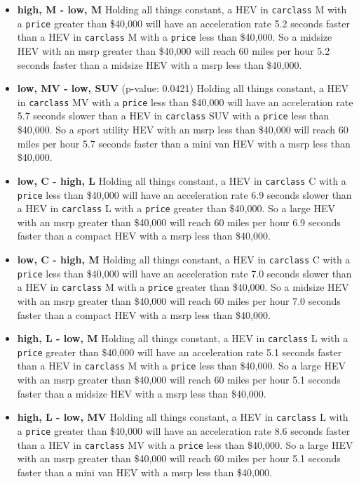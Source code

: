 \documentclass[acmsmall]{acmart}
\begin{document}
\begin{itemize}
\item[] \textbf{high, M - low, M} Holding all things constant, a HEV in \texttt{carclass} M with a \texttt{price} greater than \$40,000 will have an acceleration rate 5.2 seconds faster than a HEV in \texttt{carclass} M with a \texttt{price} less than \$40,000. So a midsize HEV with an msrp greater than \$40,000 will reach 60 miles per hour 5.2 seconds faster than a midsize HEV with a msrp less than \$40,000.
\item[] \textbf{low, MV - low, SUV} (p-value: 0.0421) Holding all things constant, a HEV in \texttt{carclass} MV with a \texttt{price} less than \$40,000 will have an acceleration rate 5.7 seconds slower than a HEV in \texttt{carclass} SUV with a \texttt{price} less than \$40,000. So a sport utility HEV with an msrp less than \$40,000 will reach 60 miles per hour 5.7 seconds faster than a mini van HEV with a msrp less than \$40,000.
\item[] \textbf{low, C - high, L} Holding all things constant, a HEV in \texttt{carclass} C with a \texttt{price} less than \$40,000 will have an acceleration rate 6.9 seconds slower than a HEV in \texttt{carclass} L with a \texttt{price} greater than \$40,000. So a large HEV with an msrp greater than \$40,000 will reach 60 miles per hour 6.9 seconds faster than a compact HEV with a msrp less than \$40,000.
\item[] \textbf{low, C - high, M} Holding all things constant, a HEV in \texttt{carclass} C with a \texttt{price} less than \$40,000 will have an acceleration rate 7.0 seconds slower than a HEV in \texttt{carclass} M with a \texttt{price} greater than \$40,000. So a midsize HEV with an msrp greater than \$40,000 will reach 60 miles per hour 7.0 seconds faster than a compact HEV with a msrp less than \$40,000.
\item[] \textbf{high, L - low, M} Holding all things constant, a HEV in \texttt{carclass} L with a \texttt{price} greater than \$40,000 will have an acceleration rate 5.1 seconds faster than a HEV in \texttt{carclass} M with a \texttt{price} less than \$40,000. So a large HEV with an msrp greater than \$40,000 will reach 60 miles per hour 5.1 seconds faster than a midsize HEV with a msrp less than \$40,000.
\item[] \textbf{high, L - low, MV} Holding all things constant, a HEV in \texttt{carclass} L with a \texttt{price} greater than \$40,000 will have an acceleration rate 8.6 seconds faster than a HEV in \texttt{carclass} MV with a \texttt{price} less than \$40,000. So a large HEV with an msrp greater than \$40,000 will reach 60 miles per hour 5.1 seconds faster than a mini van HEV with a msrp less than \$40,000.

\end{itemize}
\end{document}
